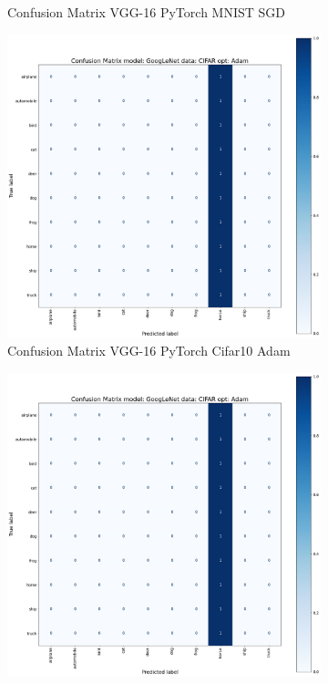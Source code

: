 \documentclass[conference]{IEEEtran}
\begin{document}
\begin{figure}[!htbp]
\begin{subfigure}[b]{0.21\textwidth}
        \caption{Confusion Matrix VGG-16 PyTorch MNIST SGD}
        \label{fig:x matrix_GG-16_PyTorch_MNIST_SGD}
    \end{subfigure}
    \begin{subfigure}[b]{0.22\textwidth}
        \centering
        \includegraphics[width=\textwidth]{img/matrix_sample.png}
        \caption{Confusion Matrix VGG-16 PyTorch Cifar10 Adam}
        \label{fig:x matrix_VGG-16_PyTorch_CIFAR_Adam}
    \end{subfigure}
    \hfill
    \begin{subfigure}[b]{0.22\textwidth}
        \centering
        \includegraphics[width=\textwidth]{img/matrix_sample.png}

\end{subfigure}
\end{figure}
\end{document}
